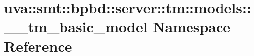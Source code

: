 \hypertarget{namespaceuva_1_1smt_1_1bpbd_1_1server_1_1tm_1_1models_1_1____tm__basic__model}{}\section{uva\+:\+:smt\+:\+:bpbd\+:\+:server\+:\+:tm\+:\+:models\+:\+:\+\_\+\+\_\+tm\+\_\+basic\+\_\+model Namespace Reference}
\label{namespaceuva_1_1smt_1_1bpbd_1_1server_1_1tm_1_1models_1_1____tm__basic__model}
